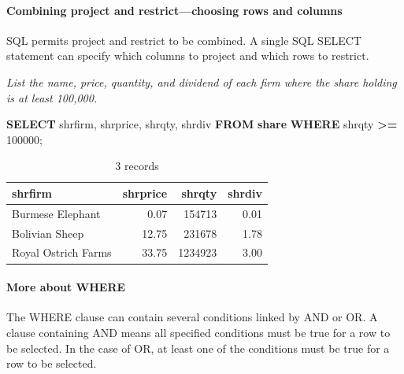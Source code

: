 \documentclass[
]{article}
\newenvironment{Shaded}{\begin{snugshade}}{\end{snugshade}}
\newcommand{\DecValTok}[1]{\textcolor[rgb]{0.00,0.00,0.81}{#1}}
\newcommand{\KeywordTok}[1]{\textcolor[rgb]{0.13,0.29,0.53}{\textbf{#1}}}
\newcommand{\NormalTok}[1]{#1}
\newcommand{\OperatorTok}[1]{\textcolor[rgb]{0.81,0.36,0.00}{\textbf{#1}}}
\begin{document}
\hypertarget{combining-project-and-restrictchoosing-rows-and-columns}{%
\paragraph*{Combining project and restrict---choosing rows and columns}\label{combining-project-and-restrictchoosing-rows-and-columns}}

SQL permits project and restrict to be combined. A single SQL SELECT statement can specify which columns to project and which rows to restrict.

\emph{List the name, price, quantity, and dividend of each firm where the share holding is at least 100,000.}

\begin{Shaded}
\begin{Highlighting}[]
\KeywordTok{SELECT}\NormalTok{ shrfirm, shrprice, shrqty, shrdiv }\KeywordTok{FROM} \KeywordTok{share}
  \KeywordTok{WHERE}\NormalTok{ shrqty }\OperatorTok{\textgreater{}=} \DecValTok{100000}\NormalTok{;}
\end{Highlighting}
\end{Shaded}

\begin{table}

\caption{\label{tab:unnamed-chunk-9}3 records}
\centering
\begin{tabular}[t]{l|r|r|r}
\hline
shrfirm & shrprice & shrqty & shrdiv\\
\hline
Burmese Elephant & 0.07 & 154713 & 0.01\\
\hline
Bolivian Sheep & 12.75 & 231678 & 1.78\\
\hline
Royal Ostrich Farms & 33.75 & 1234923 & 3.00\\
\hline
\end{tabular}
\end{table}

\hypertarget{more-about-where}{%
\paragraph*{More about WHERE}\label{more-about-where}}

The WHERE clause can contain several conditions linked by AND or OR. A clause containing AND means all specified conditions must be true for a row to be selected. In the case of OR, at least one of the conditions must be true for a row to be selected.
\end{document}
